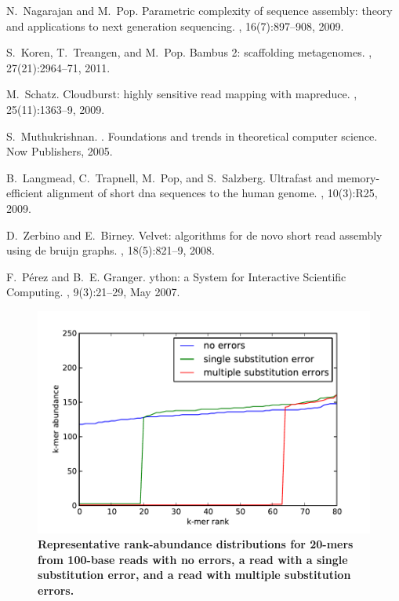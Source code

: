\documentclass{pnastwo}
\begin{document}
\begin{article}
\begin{thebibliography}{10}
N.~Nagarajan and M.~Pop.
\newblock Parametric complexity of sequence assembly: theory and applications
  to next generation sequencing.
, 16(7):897--908, 2009.

S.~Koren, T.~Treangen, and M.~Pop.
\newblock Bambus 2: scaffolding metagenomes.
, 27(21):2964--71, 2011.

M.~Schatz.
\newblock Cloudburst: highly sensitive read mapping with mapreduce.
, 25(11):1363--9, 2009.

S.~Muthukrishnan.
.
\newblock Foundations and trends in theoretical computer science. Now
  Publishers, 2005.

B.~Langmead, C.~Trapnell, M.~Pop, and S.~Salzberg.
\newblock Ultrafast and memory-efficient alignment of short dna sequences to
  the human genome.
, 10(3):R25, 2009.

D.~Zerbino and E.~Birney.
\newblock Velvet: algorithms for de novo short read assembly using de bruijn
  graphs.
, 18(5):821--9, 2008.

F.~P\'erez and B.~E. Granger.
ython: a {S}ystem for {I}nteractive {S}cientific {C}omputing.
, 9(3):21--29, May 2007.

\end{thebibliography}

\end{article}

\newpage

\begin{figure}
\centerline{\includegraphics[width=5in]{diginorm-ranks.pdf}}
\caption{
{\bf Representative rank-abundance distributions for 20-mers from 100-base reads with no errors,
a read with a single substitution error, and a read with multiple
substitution errors.}}
\label{fig:rankabund}
\end{figure}
\end{document}

